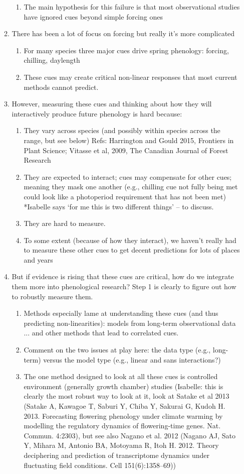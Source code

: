 \documentclass[11pt,letterpaper]{article}
\begin{document}
\begin{enumerate}
\begin{enumerate}
\begin{enumerate}
\item The main hypothesis for this failure is that  most observational studies have ignored cues beyond simple forcing ones %
\end{enumerate}
\item There has been a lot of focus on forcing but really it's more complicated
\begin{enumerate}
\item For many species three major cues drive spring phenology: forcing, chilling, daylength
\item These cues may create critical non-linear responses that most current methods cannot predict.
\end{enumerate}
\item However, measuring these cues and thinking about how they will interactively produce future phenology is hard because:
\begin{enumerate}
\item They vary across species (and possibly within species across the range, but see below) Refs: Harrington and Gould 2015, Frontiers in Plant Science; Vitasse et al, 2009, The Canadian Journal of Forest Research
\item They are expected to interact; cues may compensate for other cues; meaning they mask one another (e.g., chilling cue not fully being met could look like a photoperiod requirement that has not been met) *Isabelle says `for me this is two different things' -- to discuss.
\item They are hard to measure.
\item To some extent (because of how they interact), we haven't really had to measure these other cues to get decent predictions for lots of places and years
\end{enumerate}
\item But if evidence is rising that these cues are critical, how do we integrate them more into phenological research? Step 1 is clearly to figure out how to robustly measure them. 
\begin{enumerate}
\item Methods especially lame at understanding these cues (and thus predicting non-linearities): models from long-term observational data ... and other methods that lead to correlated cues. 
\item Comment on the two issues at play here: the data type (e.g., long-term) versus the model type (e.g., linear and sans interactions?)
\item The one method designed to look at all these cues is controlled environment (generally growth chamber) studies (Isabelle: this is clearly the most robust way to look at it, look at Satake et al 2013 (Satake A, Kawagoe T, Saburi Y, Chiba Y, Sakurai G, Kudoh H. 2013. Forecasting flowering phenology under climate warming by modelling the regulatory dynamics of flowering-time genes. Nat. Commun. 4:2303), but see also  Nagano et al. 2012 (Nagano AJ, Sato Y, Mihara M, Antonio BA, Motoyama R, Itoh H. 2012. Theory deciphering and prediction of transcriptome dynamics under fluctuating field conditions. Cell 151(6):1358–69))

\end{enumerate}
\end{enumerate}
\end{enumerate}
\end{document}
